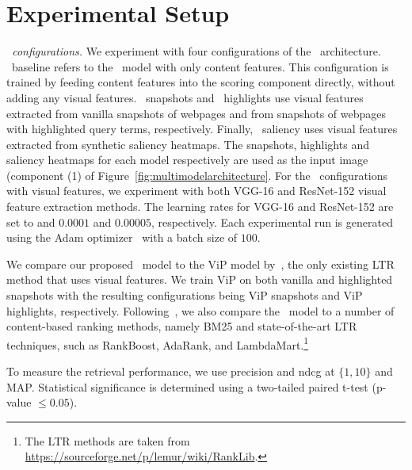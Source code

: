
\section{Experimental Setup}\label{sec:setup}
%

\mbox{}\indent\emph{\modelname~configurations.}
We experiment with four configurations of the \modelname~architecture.
\modelname~baseline refers to the \modelname~model with only content features.
This configuration is trained by feeding content features into the scoring component directly, without adding any visual features.
\modelname~snapshots and \modelname~highlights use visual features extracted from vanilla snapshots of webpages and from snapshots of webpages with highlighted query terms, respectively.
Finally, \modelname~saliency uses visual features extracted from synthetic saliency heatmaps. The snapshots, highlights and saliency heatmaps for each model respectively are used as the input image (component (1) of Figure~\ref{fig:multimodelarchitecture}.
For the \modelname~configurations with visual features, we experiment with both VGG-16 and ResNet-152 visual feature extraction methods.
The learning rates for VGG-16 and ResNet-152 are set to and $0.0001$ and $0.00005$, respectively. 
Each experimental run is generated using the Adam optimizer~\cite{kingma2014adam} with a batch size of $100$.


We compare our proposed \modelname~model to the ViP model by~\citet{fan2017learning}, the only existing \ac{LTR} method that uses visual features.
We train ViP on both vanilla and highlighted snapshots with the resulting configurations being ViP snapshots and ViP highlights, respectively.
Following~\cite{fan2017learning}, we also compare the \modelname~model to a number of content-based ranking methods,
namely BM25 and state-of-the-art \ac{LTR} techniques, such as RankBoost, AdaRank, and LambdaMart.\footnote{The \ac{LTR} methods are taken from \url{https://sourceforge.net/p/lemur/wiki/RankLib}.}

To measure the retrieval performance, we use precision and ndcg at $\{1,10\}$ and MAP.
Statistical significance is determined using a two-tailed paired t-test (p-value $\leq 0.05$). 

